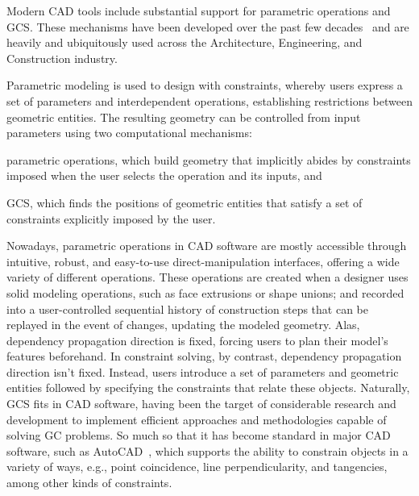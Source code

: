 %
\label{chap:intro}
\cleardoublepage{}

\noindent
Modern \ac{CAD} tools include substantial support for parametric operations and
\ac{GCS}.  These mechanisms have been developed over the past few
decades~\cite{Bettig:2011:GCSPC} and are heavily and ubiquitously used across
the Architecture, Engineering, and Construction industry.

Parametric modeling is used to design with constraints, whereby users express a
set of parameters and interdependent operations, establishing restrictions
between geometric entities.  The resulting geometry can be controlled from input
parameters using two computational mechanisms:
\begin{enumerate*}[label= (\arabic*)]
  \item parametric operations, which build geometry that implicitly abides by
  constraints imposed when the user selects the operation and its inputs, and
  \item \ac{GCS}, which finds the positions of geometric entities that satisfy a
  set of constraints explicitly imposed by the user.
\end{enumerate*}

Nowadays, parametric operations in \ac{CAD} software are mostly accessible
through intuitive, robust, and easy-to-use direct-manipulation interfaces,
offering a wide variety of different operations.  These operations are created
when a designer uses solid modeling operations, such as face extrusions or shape
unions; and recorded into a user-controlled sequential history of construction
steps that can be replayed in the event of changes, updating the modeled
geometry.  Alas, dependency propagation direction is fixed, forcing users to
plan their model's features beforehand.  In constraint solving, by contrast,
dependency propagation direction isn't fixed.  Instead, users introduce a set of
parameters and geometric entities followed by specifying the constraints that
relate these objects.  Naturally, \ac{GCS} fits in \ac{CAD} software, having
been the target of considerable research and development to implement efficient
approaches and methodologies capable of solving \ac{GC} problems.  So much so
that it has become standard in major \ac{CAD} software, such as
AutoCAD~\cite{Autodesk:1982:AutoCAD}, which supports the ability to constrain
objects in a variety of ways, e.g., point coincidence, line perpendicularity,
and tangencies, among other kinds of constraints.

